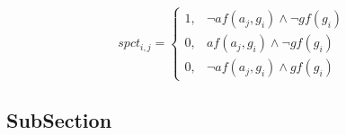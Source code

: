 \documentclass[a4paper]{article}
\begin{document}
\begin{equation}
spct_{i,j} =
\begin{cases}
1, & \text{$\neg af(a_j,g_i) \wedge \neg gf(g_i)$}\\
0, & \text{$af(a_j,g_i) \wedge \neg gf(g_i)$}\\
0, & \text{$\neg af(a_j,g_i) \wedge gf(g_i)$}
\end{cases}
\end{equation}

\subsection{SubSection}
\end{document}
